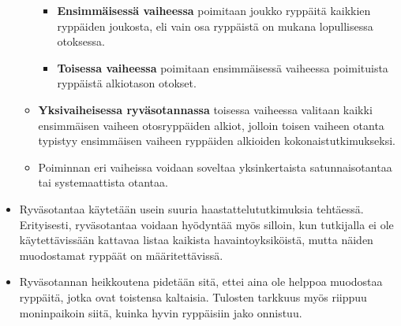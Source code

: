 \documentclass[
]{book}
\providecommand{\tightlist}{%
  \setlength{\itemsep}{0pt}\setlength{\parskip}{0pt}}
\begin{document}
\begin{itemize}
\begin{itemize}
    \begin{itemize}
    \tightlist
    \item
      \textbf{Ensimmäisessä vaiheessa} poimitaan joukko ryppäitä kaikkien ryppäiden joukosta, eli vain osa ryppäistä on mukana lopullisessa otoksessa.\\
    \item
      \textbf{Toisessa vaiheessa} poimitaan ensimmäisessä vaiheessa poimituista ryppäistä alkiotason otokset.
    \end{itemize}
  \item
    \textbf{Yksivaiheisessa ryväsotannassa} toisessa vaiheessa valitaan kaikki ensimmäisen vaiheen otosryppäiden alkiot, jolloin toisen vaiheen otanta typistyy ensimmäisen vaiheen ryppäiden alkioiden kokonaistutkimukseksi.
  \item
    Poiminnan eri vaiheissa voidaan soveltaa yksinkertaista satunnaisotantaa tai systemaattista otantaa.
  \end{itemize}
\item
  Ryväsotantaa käytetään usein suuria haastattelututkimuksia tehtäessä. Erityisesti, ryväsotantaa voidaan hyödyntää myös silloin, kun tutkijalla ei ole käytettävissään kattavaa listaa kaikista havaintoyksiköistä, mutta näiden muodostamat ryppäät on määritettävissä.
\item
  Ryväsotannan heikkoutena pidetään sitä, ettei aina ole helppoa muodostaa ryppäitä, jotka ovat toistensa kaltaisia. Tulosten tarkkuus myös riippuu moninpaikoin siitä, kuinka hyvin ryppäisiin jako onnistuu.
\end{itemize}
\end{document}
